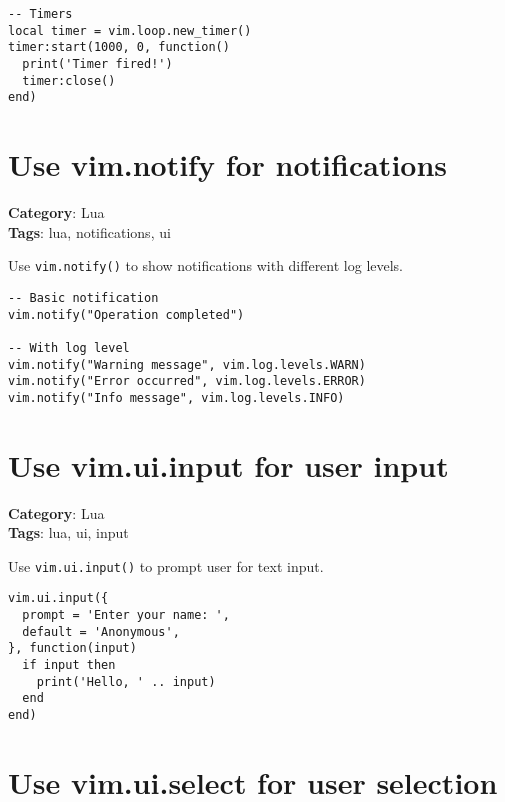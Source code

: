 {{{{{{{\begin{Exa*}{}
\begin{Verbatim}[fontsize=\footnotesize, breaklines, breakanywhere]
-- Timers
local timer = vim.loop.new_timer()
timer:start(1000, 0, function()
  print('Timer fired!')
  timer:close()
end)
\end{Verbatim}
\end{Exa*}

\section{Use vim.notify for notifications}

\textbf{Category}: Lua\\ \textbf{Tags}: lua, notifications, ui
\vspace{0.5cm}

Use {\footnotesize \Verb§vim.notify()§} to show notifications with different log levels.

\begin{Exa*}{}
\begin{Verbatim}[fontsize=\footnotesize, breaklines, breakanywhere]
-- Basic notification
vim.notify("Operation completed")

-- With log level
vim.notify("Warning message", vim.log.levels.WARN)
vim.notify("Error occurred", vim.log.levels.ERROR)
vim.notify("Info message", vim.log.levels.INFO)
\end{Verbatim}
\end{Exa*}

\section{Use vim.ui.input for user input}

\textbf{Category}: Lua\\ \textbf{Tags}: lua, ui, input
\vspace{0.5cm}

Use {\footnotesize \Verb§vim.ui.input()§} to prompt user for text input.

\begin{Exa*}{}
\begin{Verbatim}[fontsize=\footnotesize, breaklines, breakanywhere]
vim.ui.input({
  prompt = 'Enter your name: ',
  default = 'Anonymous',
}, function(input)
  if input then
    print('Hello, ' .. input)
  end
end)
\end{Verbatim}
\end{Exa*}

\section{Use vim.ui.select for user selection}

}}}}}}}
